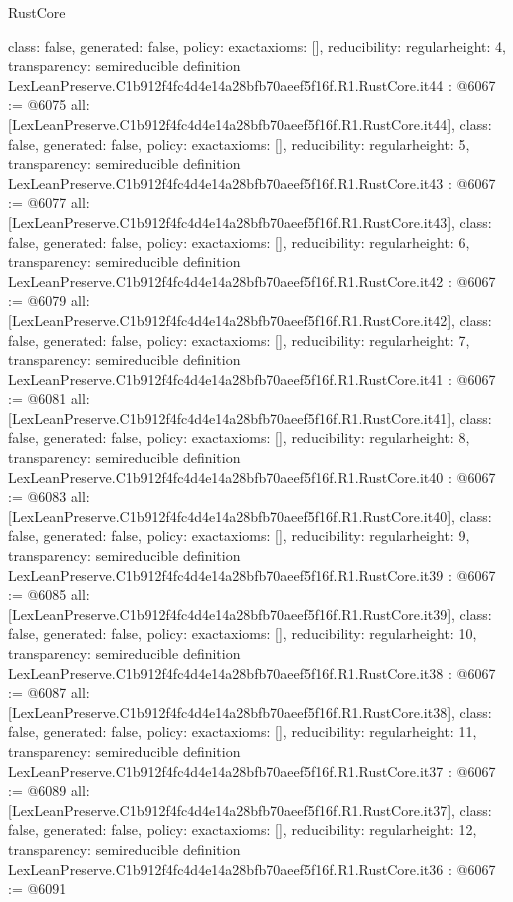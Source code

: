 \begin{lexlean}{RustCore}
\begin{coremodule}
{  class: false,
  generated: false,
  policy: exact{axioms: []},
  reducibility: regular{height: 4},
  transparency: semireducible
}
definition LexLeanPreserve.C1b912f4fc4d4e14a28bfb70aeef5f16f.R1.RustCore.it44 : @6067 := @6075 {
  all: [LexLeanPreserve.C1b912f4fc4d4e14a28bfb70aeef5f16f.R1.RustCore.it44],
  class: false,
  generated: false,
  policy: exact{axioms: []},
  reducibility: regular{height: 5},
  transparency: semireducible
}
definition LexLeanPreserve.C1b912f4fc4d4e14a28bfb70aeef5f16f.R1.RustCore.it43 : @6067 := @6077 {
  all: [LexLeanPreserve.C1b912f4fc4d4e14a28bfb70aeef5f16f.R1.RustCore.it43],
  class: false,
  generated: false,
  policy: exact{axioms: []},
  reducibility: regular{height: 6},
  transparency: semireducible
}
definition LexLeanPreserve.C1b912f4fc4d4e14a28bfb70aeef5f16f.R1.RustCore.it42 : @6067 := @6079 {
  all: [LexLeanPreserve.C1b912f4fc4d4e14a28bfb70aeef5f16f.R1.RustCore.it42],
  class: false,
  generated: false,
  policy: exact{axioms: []},
  reducibility: regular{height: 7},
  transparency: semireducible
}
definition LexLeanPreserve.C1b912f4fc4d4e14a28bfb70aeef5f16f.R1.RustCore.it41 : @6067 := @6081 {
  all: [LexLeanPreserve.C1b912f4fc4d4e14a28bfb70aeef5f16f.R1.RustCore.it41],
  class: false,
  generated: false,
  policy: exact{axioms: []},
  reducibility: regular{height: 8},
  transparency: semireducible
}
definition LexLeanPreserve.C1b912f4fc4d4e14a28bfb70aeef5f16f.R1.RustCore.it40 : @6067 := @6083 {
  all: [LexLeanPreserve.C1b912f4fc4d4e14a28bfb70aeef5f16f.R1.RustCore.it40],
  class: false,
  generated: false,
  policy: exact{axioms: []},
  reducibility: regular{height: 9},
  transparency: semireducible
}
definition LexLeanPreserve.C1b912f4fc4d4e14a28bfb70aeef5f16f.R1.RustCore.it39 : @6067 := @6085 {
  all: [LexLeanPreserve.C1b912f4fc4d4e14a28bfb70aeef5f16f.R1.RustCore.it39],
  class: false,
  generated: false,
  policy: exact{axioms: []},
  reducibility: regular{height: 10},
  transparency: semireducible
}
definition LexLeanPreserve.C1b912f4fc4d4e14a28bfb70aeef5f16f.R1.RustCore.it38 : @6067 := @6087 {
  all: [LexLeanPreserve.C1b912f4fc4d4e14a28bfb70aeef5f16f.R1.RustCore.it38],
  class: false,
  generated: false,
  policy: exact{axioms: []},
  reducibility: regular{height: 11},
  transparency: semireducible
}
definition LexLeanPreserve.C1b912f4fc4d4e14a28bfb70aeef5f16f.R1.RustCore.it37 : @6067 := @6089 {
  all: [LexLeanPreserve.C1b912f4fc4d4e14a28bfb70aeef5f16f.R1.RustCore.it37],
  class: false,
  generated: false,
  policy: exact{axioms: []},
  reducibility: regular{height: 12},
  transparency: semireducible
}
definition LexLeanPreserve.C1b912f4fc4d4e14a28bfb70aeef5f16f.R1.RustCore.it36 : @6067 := @6091 {
}
\end{coremodule}
\end{lexlean}
